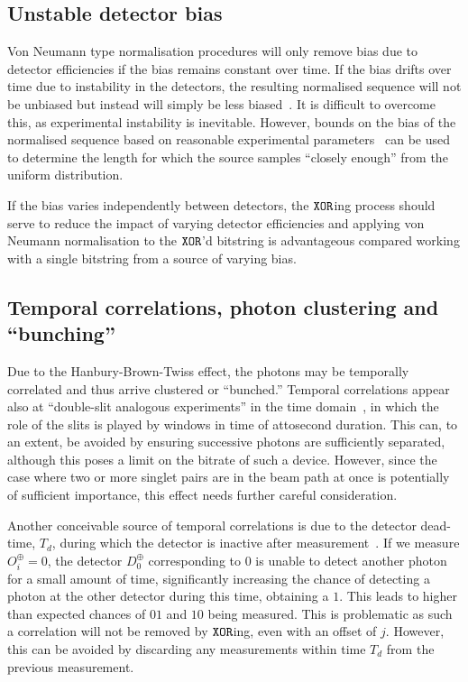 \documentclass{mscs}
\begin{document}
\subsection{Unstable detector bias}

Von Neumann type normalisation procedures will only remove bias due to detector efficiencies if the bias remains constant over time. If the bias drifts over time due to instability in the detectors, the resulting normalised sequence will not be unbiased but instead will simply be less biased~\citep{AbbottCalude10}. It is difficult to overcome this, as experimental instability is inevitable. However, bounds on the bias of the normalised sequence based on reasonable experimental parameters~\citep{AbbottCalude10} can be used to determine the length for which the source samples ``closely enough'' from the uniform distribution.

If the bias varies independently between detectors, the ${\tt XOR}$ing process should serve to reduce the impact of varying detector efficiencies and applying von Neumann normalisation to the ${\tt XOR}$'d bitstring is advantageous compared working with a single bitstring from a source of varying bias.


\subsection{Temporal correlations, photon clustering and ``bunching''}

Due to the Hanbury-Brown-Twiss effect, the photons may be temporally correlated and thus arrive clustered or ``bunched.''
Temporal correlations appear also at ``double-slit analogous experiments'' in the time domain~\citep{PhysRevLett.95.040401},
in which the role of the slits is played by windows in time of attosecond duration.  This can, to an extent, be avoided by ensuring successive photons are sufficiently separated, although this poses a limit on the bitrate of such a device. However, since the case where two or more singlet pairs are in the beam path at once is potentially of sufficient importance, this effect needs further careful consideration.

Another conceivable source of temporal correlations is due to the detector dead-time, $T_d$, during which the detector is inactive after measurement~\citep{stefanov-2000}. If we measure $O^\oplus_i=0$, the detector $D^\oplus_0$ corresponding to $0$ is unable to detect another photon for a small amount of time, significantly increasing the chance of detecting a photon at the other detector during this time, obtaining a $1$. This leads to higher than expected chances of $01$ and $10$ being measured. This is problematic as such a correlation will not be removed by ${\tt XOR}$ing, even with an offset of $j$. However, this can be avoided by discarding any measurements within time $T_d$ from the previous measurement.
\end{document}
